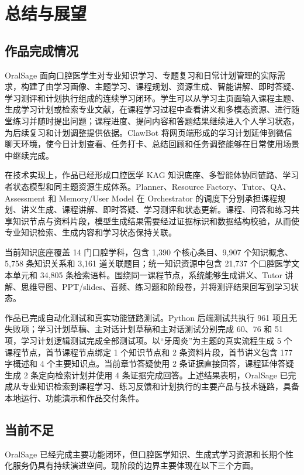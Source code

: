 \chapter{总结与展望}
\label{sec:conclusion}

\section{作品完成情况}

OralSage 面向口腔医学生对专业知识学习、专题复习和日常计划管理的实际需求，构建了由学习画像、主题学习、课程规划、资源生成、智能讲解、即时答疑、学习测评和计划执行组成的连续学习闭环。学生可以从学习主页面输入课程主题、生成学习计划或检索专业文献，在课程学习过程中查看讲义和多模态资源、进行随堂练习并随时提出问题；课程进度、提问内容和答题结果继续进入个人学习状态，为后续复习和计划调整提供依据。ClawBot 将网页端形成的学习计划延伸到微信聊天环境，使今日计划查看、任务打卡、总结回顾和任务调整能够在日常使用场景中继续完成。

在技术实现上，作品已经形成口腔医学 KAG 知识底座、多智能体协同链路、学习者状态模型和同主题资源生成体系。Planner、Resource Factory、Tutor、QA、Assessment 和 Memory/User Model 在 Orchestrator 的调度下分别承担课程规划、讲义生成、课程讲解、即时答疑、学习测评和状态更新。课程、问答和练习共享知识节点与资料片段，模型生成结果需要经过证据标识和数据结构校验，从而使专业知识检索、生成内容和学习状态保持关联。

当前知识底座覆盖 14 门口腔学科，包含 1,390 个核心条目、9,907 个知识概念、5,758 条知识关系和 3,161 道关联题目；统一知识资源中包含 21,737 个口腔医学文本单元和 34,805 条检索语料。围绕同一课程节点，系统能够生成讲义、Tutor 讲解、思维导图、PPT/slides、音频、练习题和阶段卷，并将测评结果回写到学习状态。

作品已完成自动化测试和真实功能链路测试。Python 后端测试共执行 961 项且无失败项；学习计划草稿、主对话计划草稿和主对话测试分别完成 60、76 和 51 项，学习计划逻辑测试完成全部测试项。以“牙周炎”为主题的真实流程生成 5 个课程节点，首节课程节点绑定 1 个知识节点和 2 条资料片段，首节讲义包含 177 字概述和 4 个主要知识点。当前章节答疑使用 2 条证据直接回答，课程延伸答疑生成 2 条定向检索计划并使用 4 条证据完成回答。上述结果表明，OralSage 已完成从专业知识检索到课程学习、练习反馈和计划执行的主要产品与技术链路，具备本地运行、功能演示和作品交付条件。

\section{当前不足}

OralSage 已经完成主要功能闭环，但口腔医学知识、生成式学习资源和长期个性化服务仍具有持续演进空间。现阶段的边界主要体现在以下三个方面。

